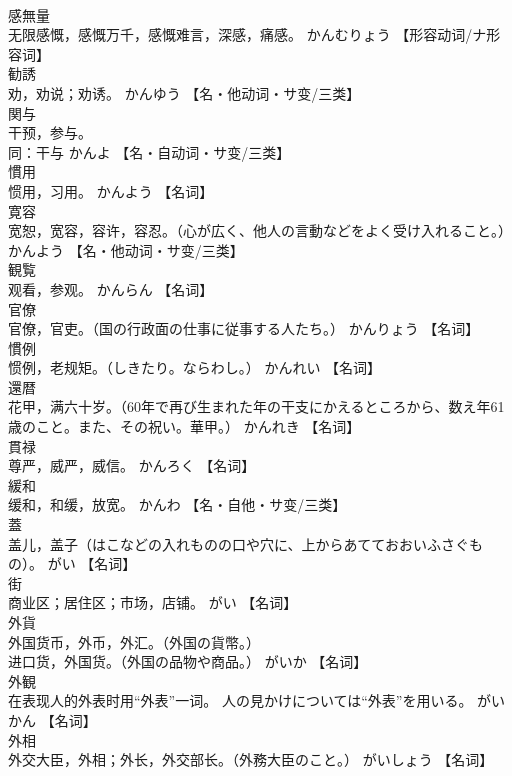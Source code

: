 \documentclass[8pt]{extreport}
\begin{document}
\begin{CJK}{UTF8}{min}
\\	感無量	
\\	无限感慨，感慨万千，感慨难言，深感，痛感。	かんむりょう		【形容动词/ナ形容词】
\\	勧誘	
\\	劝，劝说；劝诱。	かんゆう		【名・他动词・サ变/三类】
\\	関与	
\\	干预，参与。 
\\	同：干与	かんよ		【名・自动词・サ变/三类】
\\	慣用	
\\	惯用，习用。	かんよう		【名词】
\\	寛容	
\\	宽恕，宽容，容许，容忍。（心が広く、他人の言動などをよく受け入れること。）	かんよう		【名・他动词・サ变/三类】
\\	観覧	
\\	观看，参观。	かんらん		【名词】
\\	官僚	
\\	官僚，官吏。（国の行政面の仕事に従事する人たち。）	かんりょう		【名词】
\\	慣例	
\\	惯例，老规矩。（しきたり。ならわし。）	かんれい		【名词】
\\	還暦	
\\	花甲，满六十岁。（60年で再び生まれた年の干支にかえるところから、数え年61歳のこと。また、その祝い。華甲。）	かんれき		【名词】
\\	貫禄	
\\	尊严，威严，威信。	かんろく		【名词】
\\	緩和	
\\	缓和，和缓，放宽。	かんわ		【名・自他・サ变/三类】
\\	蓋	
\\	盖儿，盖子（はこなどの入れものの口や穴に、上からあてておおいふさぐもの）。	がい		【名词】
\\	街	
\\	商业区；居住区；市场，店铺。	がい		【名词】
\\	外貨	
\\	外国货币，外币，外汇。（外国の貨幣。） 
\\	进口货，外国货。（外国の品物や商品。）	がいか		【名词】
\\	外観	
\\	在表现人的外表时用“外表”一词。 人の見かけについては“外表”を用いる。	がいかん		【名词】
\\	外相	
\\	外交大臣，外相；外长，外交部长。（外務大臣のこと。）	がいしょう		【名词】

\end{CJK}
\end{document}
